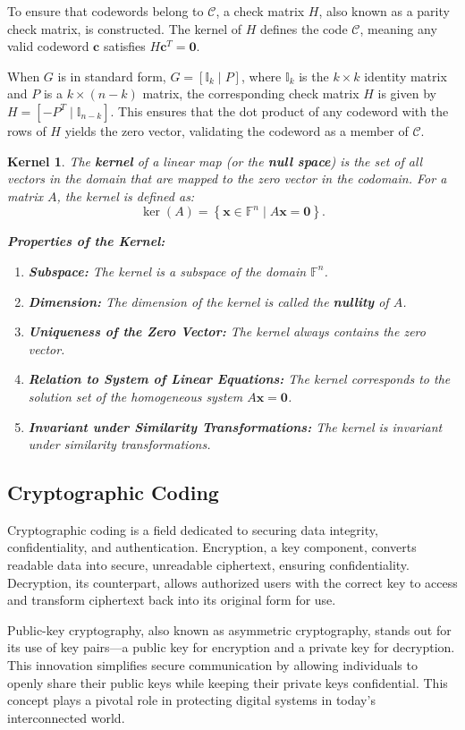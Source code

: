 To ensure that codewords belong to \(\mathcal{C}\), a check matrix \(H\), also known as a parity check matrix, is constructed. The kernel of \(H\) defines the code \(\mathcal{C}\), meaning any valid codeword \( \mathbf{c} \) satisfies \( H\mathbf{c}^T = \mathbf{0} \).

When \(G\) is in standard form, \( G = [\mathbb{I}_k \mid P] \), where \(\mathbb{I}_k\) is the \(k \times k\) identity matrix and \(P\) is a \(k \times (n-k)\) matrix, the corresponding check matrix \(H\) is given by \( H = [-P^T \mid \mathbb{I}_{n-k}] \). This ensures that the dot product of any codeword with the rows of \(H\) yields the zero vector, validating the codeword as a member of \(\mathcal{C}\).

\newtheorem*{krl}{Kernel}
\begin{krl}
The \textbf{kernel} of a linear map (or the \textbf{null space}) is the set of all vectors in the domain that are mapped to the zero vector in the codomain. For a matrix \(A\), the kernel is defined as:
\[
\ker(A) = \left\{ \mathbf{x} \in \mathbb{F}^n \mid A\mathbf{x} = \mathbf{0} \right\}.
\]

\textbf{Properties of the Kernel:}
\begin{enumerate}
    \item \textbf{Subspace:} The kernel is a subspace of the domain \(\mathbb{F}^n\).
    \item \textbf{Dimension:} The dimension of the kernel is called the \textbf{nullity} of \(A\).
    \item \textbf{Uniqueness of the Zero Vector:} The kernel always contains the zero vector.
    \item \textbf{Relation to System of Linear Equations:} The kernel corresponds to the solution set of the homogeneous system \(A\mathbf{x} = \mathbf{0}\).
    \item \textbf{Invariant under Similarity Transformations:} The kernel is invariant under similarity transformations.
\end{enumerate}
\end{krl}




\subsection{Cryptographic Coding}
Cryptographic coding is a field dedicated to securing data integrity, confidentiality, and authentication. Encryption, a key component, converts readable data into secure, unreadable ciphertext, ensuring confidentiality. Decryption, its counterpart, allows authorized users with the correct key to access and transform ciphertext back into its original form for use.

Public-key cryptography, also known as asymmetric cryptography, stands out for its use of key pairs—a public key for encryption and a private key for decryption. This innovation simplifies secure communication by allowing individuals to openly share their public keys while keeping their private keys confidential. This concept plays a pivotal role in protecting digital systems in today's interconnected world.

